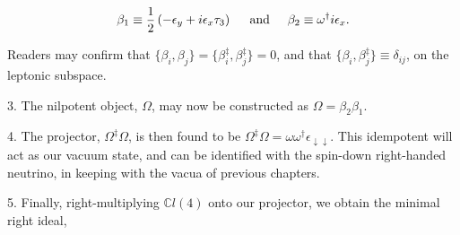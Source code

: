 \documentclass[letterpaper,12pt,titlepage,oneside,final]{book}
\newcommand{\CLfour}{\mathbb{C}l(4)}
\newcommand{\oot}{\omega \omega^{\dagger}}
\begin{document}
\begin{equation}
\beta_1\equiv \frac{1}{2}\left(-\epsilon_y +i\epsilon_x\tau_3\right) \hspace{5mm} \textup{and} \hspace{5mm}\beta_2\equiv \omega^{\dagger}i\epsilon_x.  
\end{equation}

\noindent Readers may confirm that $\{\beta_i, \beta_j\} = \{\beta_i^{\ddag}, \beta_j^{\ddag}\} =0$, and that $\{\beta_i, \beta_j^{\ddag}\} \equiv \delta_{ij}$, on the leptonic subspace.



\vspace{7mm}

3.  The nilpotent object, $\Omega$, may now be constructed as $\Omega = \beta_2 \beta_1$.

\vspace{7mm}

4.  The projector, $\Omega^{\ddag}\Omega$, is then found to be $\Omega^{\ddag}\Omega = \oot \epsilon_{\downarrow\downarrow}$.  This idempotent will act as our vacuum state, and can be identified with the spin-down right-handed neutrino, in keeping with the vacua of previous chapters.

\vspace{7mm}

5.  Finally, right-multiplying $\CLfour$ onto our projector, we obtain the minimal right ideal, 
\end{document}
